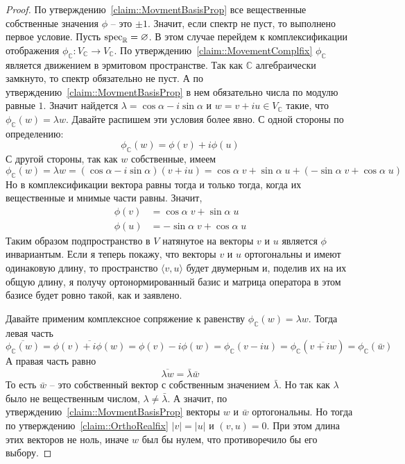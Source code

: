 \begin{proof}
По утверждению~\ref{claim::MovmentBasisProp} все вещественные собственные значения $\phi$ -- это $\pm 1$. Значит, если спектр не пуст, то выполнено первое условие. Пусть $\operatorname{spec}_\mathbb R= \varnothing$. В этом случае перейдем к комплексификации отображения $\phi_\mathbb C\colon V_\mathbb C\to V_\mathbb C$. По утверждению~\ref{claim::MovementComplfix} $\phi_\mathbb C$ является движением в эрмитовом пространстве. Так как $\mathbb C$ алгебраически замкнуто, то спектр обязательно не пуст. А по утверждению~\ref{claim::MovmentBasisProp} в нем обязательно числа по модулю равные $1$. Значит найдется $\lambda = \cos \alpha - i \sin \alpha$ и $w= v + i u\in V_\mathbb C$ такие, что $\phi_\mathbb C(w) = \lambda w$. Давайте распишем эти условия более явно. С одной стороны по определению:
\[
\phi_\mathbb C(w) = \phi(v) + i\phi(u)
\]
С другой стороны, так как $w$ собственные, имеем
\[
\phi_\mathbb C(w) = \lambda w = (\cos \alpha - i \sin \alpha) (v+ i u) = \cos \alpha \;v + \sin \alpha\; u + (-\sin \alpha\; v +\cos\alpha\; u)
\]
Но в комплексификации вектора равны тогда и только тогда, когда их вещественные и мнимые части равны. Значит,
\begin{align*}
\phi(v) &= \cos \alpha\; v + \sin \alpha\; u\\
\phi(u) &= -\sin \alpha\; v +\cos\alpha\; u
\end{align*}
Таким образом подпространство в $V$ натянутое на векторы $v$ и $u$ является $\phi$ инвариантым. Если я теперь покажу, что векторы $v$ и $u$ ортогональны и имеют одинаковую длину, то пространство $\langle v,u\rangle$ будет двумерным и, поделив их на их общую длину, я получу ортонормированный базис и матрица оператора в этом базисе будет ровно такой, как и заявлено.

Давайте применим комплексное сопряжение к равенству $\phi_\mathbb C(w) = \lambda w$. Тогда левая часть
\[
\overline{\phi_\mathbb C(w)} = \overline{\phi(v) + i \phi(w)} = \phi(v) - i \phi(w) = \phi_\mathbb C(v - iu) = \phi_\mathbb C(\overline{v + i w}) = \phi_\mathbb C(\bar w)
\]
А правая часть равно
\[
\overline{\lambda w} = \bar \lambda \bar w
\]
То есть $\bar w$ -- это собственный вектор с собственным значением $\bar \lambda$. Но так как $\lambda$ было не вещественным числом, $\lambda \neq \bar\lambda$. А значит, по утверждению~\ref{claim::MovmentBasisProp} векторы $w$ и $\bar w$ ортогональны. Но тогда по утверждению~\ref{claim::OrthoRealfix} $|v| = |u|$ и $(v, u) = 0$. При этом длина этих векторов не ноль, иначе $w$ был бы нулем, что противоречило бы его выбору.

\end{proof}

